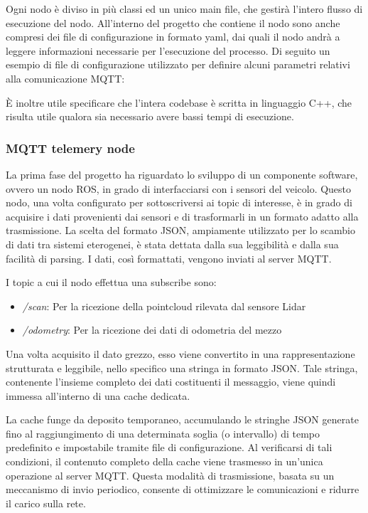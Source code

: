 \noindent Ogni nodo è diviso in più classi ed un unico main file, che gestirà l'intero flusso di esecuzione del nodo. All'interno del progetto che contiene il nodo sono anche compresi dei file di configurazione in formato yaml, dai quali il nodo andrà a leggere informazioni necessarie per l'esecuzione del processo. Di seguito un esempio di file di configurazione utilizzato per definire alcuni parametri relativi alla comunicazione MQTT:



\noindent È inoltre utile specificare che l'intera codebase è scritta in linguaggio C++, che risulta utile qualora sia necessario avere bassi tempi di esecuzione.

\subsubsection{MQTT telemery node}
La prima fase del progetto ha riguardato lo sviluppo di un componente software, ovvero un nodo ROS, in grado di interfacciarsi con i sensori del veicolo. Questo nodo, una volta configurato per sottoscriversi ai topic di interesse, è in grado di acquisire i dati provenienti dai sensori e di trasformarli in un formato adatto alla trasmissione. La scelta del formato JSON, ampiamente utilizzato per lo scambio di dati tra sistemi eterogenei, è stata dettata dalla sua leggibilità e dalla sua facilità di parsing. I dati, così formattati, vengono inviati al server MQTT.

\noindent I topic a cui il nodo effettua una subscribe sono:

\begin{itemize}
  \item \textit{/scan}: Per la ricezione della pointcloud rilevata dal sensore Lidar
  \item \textit{/odometry}: Per la ricezione dei dati di odometria del mezzo
\end{itemize}

\noindent Una volta acquisito il dato grezzo, esso viene convertito in una rappresentazione strutturata e leggibile, nello specifico una stringa in formato JSON. Tale stringa, contenente l'insieme completo dei dati costituenti il messaggio, viene quindi immessa all'interno di una cache dedicata.

\noindent La cache funge da deposito temporaneo, accumulando le stringhe JSON generate fino al raggiungimento di una determinata soglia (o intervallo) di tempo predefinito e impostabile tramite file di configurazione. Al verificarsi di tali condizioni, il contenuto completo della cache viene trasmesso in un'unica operazione al server MQTT. Questa modalità di trasmissione, basata su un meccanismo di invio periodico, consente di ottimizzare le comunicazioni e ridurre il carico sulla rete.

